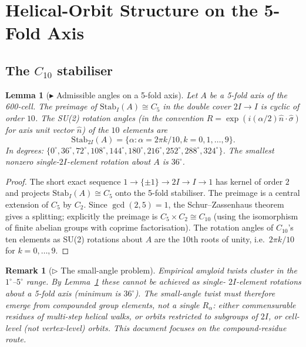 \documentclass[12pt]{article}
\newtheorem{remark}[theorem]{Remark}
\newtheorem{lemma}[theorem]{Lemma}
\newcommand{\Stab}{\mathrm{Stab}}
\begin{document}
\section{Helical-Orbit Structure on the 5-Fold Axis}\label{sec:orbits}

\subsection{The $C_{10}$ stabiliser}

\begin{lemma}[$\blacktriangleright$ Admissible angles on a 5-fold axis]\label{lem:L1}
Let $A$ be a 5-fold axis of the 600-cell. The preimage of
$\Stab_I(A) \cong C_5$ in the double cover $2I \to I$ is cyclic
of order $10$. The SU(2) rotation angles (in the convention
$R = \exp(i(\alpha/2)\hat{n} \cdot \hat{\sigma})$ for axis unit
vector $\hat{n}$) of the $10$ elements are
\[
\Stab_{2I}(A) = \{\alpha : \alpha = 2\pi k / 10, k = 0, 1, \ldots, 9\}.
\]
In degrees: $\{0^{\circ}, 36^{\circ}, 72^{\circ}, 108^{\circ},
144^{\circ}, 180^{\circ}, 216^{\circ}, 252^{\circ}, 288^{\circ},
324^{\circ}\}$. The smallest nonzero single-$2I$-element
rotation about $A$ is $36^{\circ}$.
\end{lemma}

\begin{proof}
The short exact sequence $1 \to \{\pm 1\} \to 2I \to I \to 1$
has kernel of order $2$ and projects $\Stab_I(A) \cong C_5$ onto
the 5-fold stabiliser. The preimage is a central extension of
$C_5$ by $C_2$. Since $\gcd(2, 5) = 1$, the
Schur--Zassenhaus theorem gives a splitting; explicitly the
preimage is $C_5 \times C_2 \cong C_{10}$ (using the isomorphism
of finite abelian groups with coprime factorisation). The
rotation angles of $C_{10}$'s ten elements as SU(2) rotations
about $A$ are the $10$th roots of unity, i.e.\ $2\pi k / 10$ for
$k = 0, \ldots, 9$.
\end{proof}

\begin{remark}[$\triangleright$ The small-angle problem]\label{rem:R1}
Empirical amyloid twists cluster in the $1^{\circ}$--$5^{\circ}$
range. By Lemma~\ref{lem:L1} these cannot be achieved as single-
$2I$-element rotations about a 5-fold axis (minimum is
$36^{\circ}$). The small-angle twist must therefore emerge from
\emph{compounded} group elements, not a single $R_\alpha$: either
commensurable residues of multi-step helical walks, or orbits
restricted to subgroups of $2I$, or cell-level (not vertex-level)
orbits. This document focuses on the compound-residue route.
\end{remark}
\end{document}
